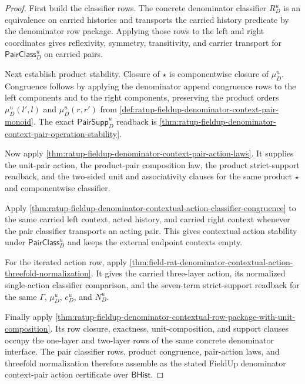 \begin{proof}
First build the classifier rows. The concrete denominator classifier
$R_D^u$ is an equivalence on carried histories and transports the carried
history predicate by the denominator row package. Applying those rows to the
left and right coordinates gives reflexivity, symmetry, transitivity, and
carrier transport for $\mathsf{PairClass}_D^u$ on carried pairs.

Next establish product stability. Closure of $\star$ is componentwise closure
of $\mu_D^u$. Congruence follows by applying the denominator append congruence
rows to the left components and to the right components, preserving the product
orders $\mu_D^u(l',l)$ and $\mu_D^u(r,r')$ from
\autoref{def:ratup-fieldup-denominator-context-pair-monoid}. The exact
$\mathsf{PairSupp}_D^u$ readback is
\autoref{thm:ratup-fieldup-denominator-context-pair-operation-stability}.

Now apply
\autoref{thm:ratup-fieldup-denominator-context-pair-action-laws}. It supplies
the unit-pair action, the product-pair composition law, the product
strict-support readback, and the two-sided unit and associativity clauses for
the same product $\star$ and componentwise classifier.

Apply
\autoref{thm:ratup-fieldup-denominator-contextual-action-classifier-congruence}
to the same carried left context, acted history, and carried right context
whenever the pair classifier transports an acting pair. This gives contextual
action stability under $\mathsf{PairClass}_D^u$ and keeps the external endpoint
contexts empty.

For the iterated action row, apply
\autoref{thm:field-rat-denominator-contextual-action-threefold-normalization}.
It gives the carried three-layer action, its normalized single-action classifier
comparison, and the seven-term strict-support readback for the same
$\Gamma$, $\mu_D^u$, $e_D^u$, and $N_D^u$.

Finally apply
\autoref{thm:ratup-fieldup-denominator-contextual-row-package-with-unit-composition}.
Its row closure, exactness, unit-composition, and support clauses occupy the
one-layer and two-layer rows of the same concrete denominator interface. The
pair classifier rows, product congruence, pair-action laws, and threefold
normalization therefore assemble as the stated FieldUp denominator
context-pair action certificate over $\mathsf{BHist}$.
\end{proof}

